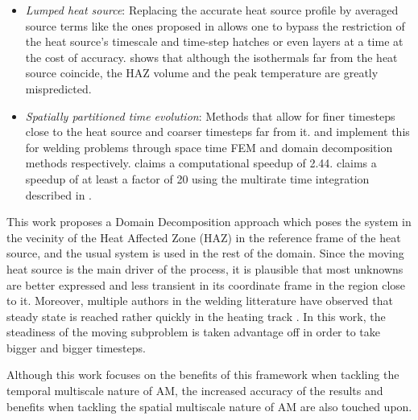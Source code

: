 \begin{itemize}
  \item \textit{Lumped heat source}: Replacing the accurate
    heat source profile by averaged source terms
    like the ones proposed in \cite{Chiumenti2017, Malmelv2019}
    allows one to bypass the restriction of
    the heat source's timescale and time-step hatches
    or even layers at a time at the cost of accuracy.
    \cite{VanElsen2007} shows that although the
    isothermals far from the heat source coincide,
    the HAZ volume and the peak temperature are
    greatly mispredicted.
  \item \textit{Spatially partitioned time evolution}: Methods
    that allow for finer timesteps close to the heat source
    and coarser timesteps far from it. \cite{Kopp2022} and
    \cite{Viguerie2022} implement this for welding problems
    through space time FEM and domain decomposition methods respectively.
    \cite{Viguerie2022} claims a computational speedup of 2.44.
    \cite{Puso2023} claims a speedup of at least a factor of 20
    using the multirate time integration described in \cite{Hodge2021}.
\end{itemize}

This work proposes a Domain Decomposition approach which poses the
system in the vecinity of the Heat Affected Zone (HAZ) in the
reference frame of the heat source, and the usual system is used
in the rest of the domain. Since the moving heat source is the main driver
of the process, it is plausible that most unknowns are
better expressed and less transient in its coordinate frame in the region close to it.
Moreover, multiple authors in the welding litterature
have observed that steady state is reached rather quickly in the heating track
\cite{Mundra1996, VanElsen2007, Powar2016}. In this work,
the steadiness of the moving subproblem is taken advantage off 
in order to take bigger and bigger timesteps.\par

Although this work focuses on the benefits of this framework
when tackling the temporal multiscale nature of AM,
the increased accuracy of the results and benefits
when tackling the spatial multiscale nature of AM \cite{Storti2022, carraturo2021twolevel}
are also touched upon.\par
